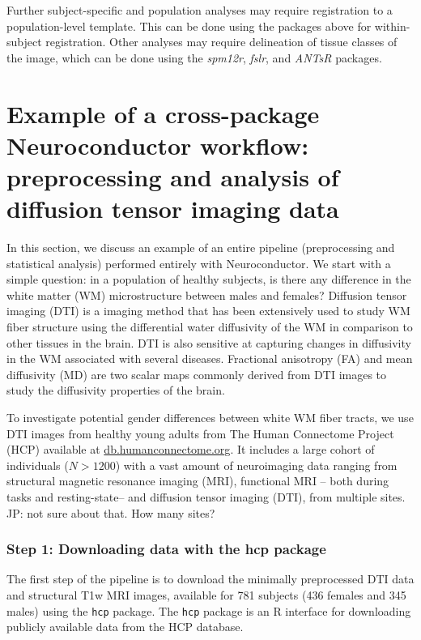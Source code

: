 \documentclass[]{elsarticle} %
\newcommand{\pkg}[1]{\emph{#1}}
\newcommand{\fixme}[1]{{\color{red} #1}}
\begin{document}
Further subject-specific and population analyses may require registration to a population-level template. This can be done using the packages above for within-subject registration.  Other analyses may require delineation of tissue classes of the image, which can be done using the \pkg{spm12r}, \pkg{fslr}, and \pkg{ANTsR} packages. 

\section{Example of a cross-package Neuroconductor workflow: preprocessing and analysis of diffusion tensor imaging data}

In this section, we discuss an example of an entire pipeline (preprocessing and statistical analysis) performed entirely with Neuroconductor.  We start with a simple question: in a population of healthy subjects, is there any difference in the white matter (WM) microstructure between males and females? Diffusion tensor imaging (DTI) is a imaging method that has been extensively used to study WM fiber structure using the differential water diffusivity of the WM in comparison to other tissues in the brain. DTI is also sensitive at capturing changes in diffusivity in the WM associated with several diseases. Fractional anisotropy (FA) and mean diffusivity (MD) are two scalar maps commonly derived from DTI images to study the diffusivity properties of the brain. 

To investigate potential gender differences between white WM fiber tracts, we use DTI images from healthy young adults from The Human Connectome Project (HCP) available at \url{db.humanconnectome.org}.  It includes a large cohort of individuals ($N > 1200$) with a vast amount of neuroimaging data ranging from structural magnetic resonance imaging (MRI), functional MRI -- both during tasks and resting-state-- and diffusion tensor imaging (DTI), \fixme{from multiple sites. JP: not sure about that. How many sites? }

\subsubsection{Step 1: Downloading data with the hcp package}
The first step of the pipeline is to download the minimally preprocessed DTI data \citep{hcpminimal} and structural T1w MRI images, available  for 781 subjects (436 females and 345 males) using the \texttt{hcp} \citep{hcp} package.  The \texttt{hcp} package is an R interface for downloading publicly available data from the HCP database. 
\end{document}
